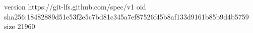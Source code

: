 version https://git-lfs.github.com/spec/v1
oid sha256:18482889d51e53f2e5c7bd81c345a7ef87526f45b8af133d9161b85b9d4b5759
size 21960

